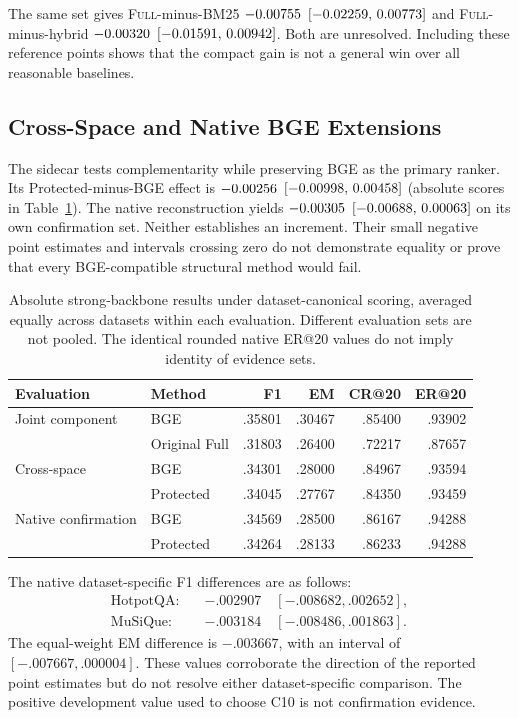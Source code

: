 \documentclass[11pt,a4paper]{article}
\newcommand{\full}{\textsc{Full}\xspace}
\begin{document}
The same set gives \full-minus-BM25 $-0.00755$ $[-0.02259,\,0.00773]$ and
\full-minus-hybrid $-0.00320$ $[-0.01591,\,0.00942]$.
Both are unresolved. Including these reference points shows that the compact
gain is not a general win over all reasonable baselines.

\subsection{Cross-Space and Native BGE Extensions}
The sidecar tests complementarity while preserving BGE as the primary ranker.
Its Protected-minus-BGE effect is $-0.00256$ $[-0.00998,\,0.00458]$
(absolute scores in Table~\ref{tab:strong}).
The native reconstruction yields $-0.00305$ $[-0.00688,\,0.00063]$ on its own
confirmation set. Neither establishes an increment. Their small negative
point estimates and intervals crossing zero do not demonstrate equality or
prove that every BGE-compatible structural method would fail.

\begin{table}[t]
\centering\small
\begin{tabular}{@{}llrrrr@{}}
\toprule
Evaluation & Method & F1 & EM & CR@20 & ER@20\\
\midrule
Joint component & BGE & .35801 & .30467 & .85400 & .93902\\
 & Original Full & .31803 & .26400 & .72217 & .87657\\
Cross-space & BGE & .34301 & .28000 & .84967 & .93594\\
 & Protected & .34045 & .27767 & .84350 & .93459\\
Native confirmation & BGE & .34569 & .28500 & .86167 & .94288\\
 & Protected & .34264 & .28133 & .86233 & .94288\\
\bottomrule
\end{tabular}
\caption{Absolute strong-backbone results under dataset-canonical scoring, averaged
equally across datasets within each evaluation. Different evaluation sets
are not pooled. The identical rounded native ER@20 values do not imply
identity of evidence sets.}
\label{tab:strong}
\end{table}

The native dataset-specific F1 differences are as follows:
\begin{align*}
\text{HotpotQA:}\quad &-.002907\quad [-.008682,.002652],\\
\text{MuSiQue:}\quad &-.003184\quad [-.008486,.001863].
\end{align*}
The equal-weight EM difference is $-.003667$, with an interval of
$[-.007667,.000004]$. These values corroborate the direction
of the reported point estimates but do not resolve either dataset-specific
comparison. The positive development value used to choose C10 is not
confirmation evidence.
\end{document}
